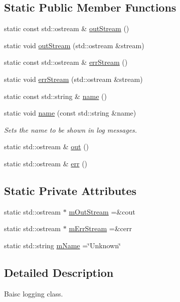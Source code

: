 \subsection*{Static Public Member Functions}
\begin{DoxyCompactItemize}
\item 
static const std\+::ostream \& \hyperlink{classLog_a27b116b095e6e08d5e40fd365210c657}{out\+Stream} ()
\item 
static void \hyperlink{classLog_ad5a9c8a9d7f84d36041f21058f450e53}{out\+Stream} (std\+::ostream \&stream)
\item 
static const std\+::ostream \& \hyperlink{classLog_ac209747fd4964bc121818481ee131d19}{err\+Stream} ()
\item 
static void \hyperlink{classLog_ab2c566571ace5d3f234707ddfaaed4c9}{err\+Stream} (std\+::ostream \&stream)
\item 
static const std\+::string \& \hyperlink{classLog_a5a4518f9758b1eee0adcac1c3119288b}{name} ()
\item 
static void \hyperlink{classLog_a5758fde0052d1b682c6e2a33be192ecd}{name} (const std\+::string \&name)
\begin{DoxyCompactList}\small\item\em Sets the name to be shown in log messages. \end{DoxyCompactList}\item 
static std\+::ostream \& \hyperlink{classLog_ab89f6644dd040b1fa07c1253cc12bafb}{out} ()
\item 
static std\+::ostream \& \hyperlink{classLog_ad37da894b6f997bc5204ed81cace26c2}{err} ()
\end{DoxyCompactItemize}
\subsection*{Static Private Attributes}
\begin{DoxyCompactItemize}
\item 
static std\+::ostream $\ast$ \hyperlink{classLog_accbb35e5dcd2989a5a2085fc455e4685}{m\+Out\+Stream} =\&cout
\item 
static std\+::ostream $\ast$ \hyperlink{classLog_aa8469d1a7367bb976e1bc39514960ed5}{m\+Err\+Stream} =\&cerr
\item 
static std\+::string \hyperlink{classLog_a3c7121dc792ba672538009dd64585146}{m\+Name} =\char`\"{}Unknown\char`\"{}
\end{DoxyCompactItemize}


\subsection{Detailed Description}
Baisc logging class. 

